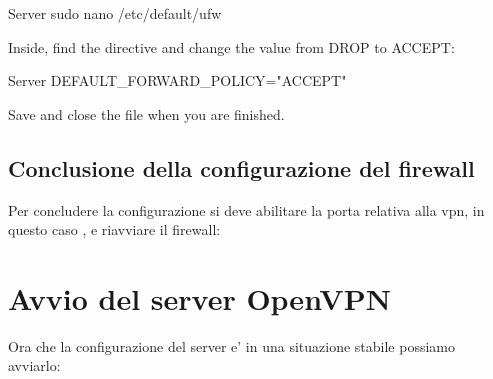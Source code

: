 \begin{bashcode}{Server}{}
sudo nano /etc/default/ufw
\end{bashcode}

Inside, find the  directive and change the value from DROP to ACCEPT:

\begin{bashcode}{Server}{}
DEFAULT_FORWARD_POLICY="ACCEPT"
\end{bashcode}

Save and close the file when you are finished.

\subsection{Conclusione della configurazione del firewall}

Per concludere la configurazione si deve abilitare la porta relativa alla vpn, in questo caso , e riavviare il firewall:



\section{Avvio del server OpenVPN}
\label{sec:start_server}

Ora che la configurazione del server e' in una situazione stabile possiamo avviarlo:

